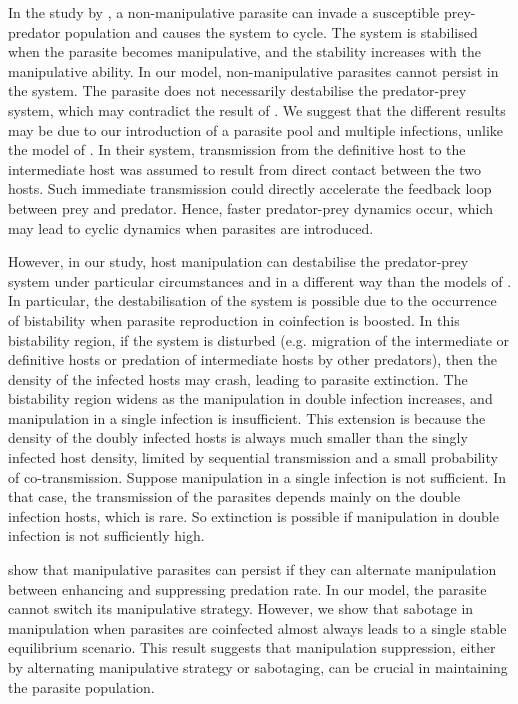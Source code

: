 \documentclass[11pt]{article}
\begin{document}
In the study by \cite{Rogawa2018}, a non-manipulative parasite can invade a susceptible prey-predator population and causes the system to cycle. 
The system is stabilised when the parasite becomes manipulative, and the stability increases with the manipulative ability.
In our model, non-manipulative parasites cannot persist in the system. The parasite does not necessarily destabilise the predator-prey system, which may contradict the result of \cite{Rogawa2018}. 
We suggest that the different results may be due to our introduction of a parasite pool and multiple infections, unlike the model of \cite{Rogawa2018}. 
In their system, transmission from the definitive host to the intermediate host was assumed to result from direct contact between the two hosts. 
Such immediate transmission could directly accelerate the feedback loop between prey and predator. 
Hence, faster predator-prey dynamics occur, which may lead to cyclic dynamics when parasites are introduced.

However, in our study, host manipulation can destabilise the predator-prey system under particular circumstances and in a different way than the models of \cite{Rogawa2018}. 
In particular, the destabilisation of the system is possible due to the occurrence of bistability when parasite reproduction in coinfection is boosted. 
In this bistability region, if the system is disturbed (e.g. migration of the intermediate or definitive hosts or predation of intermediate hosts by other predators), then the density of the infected hosts may crash, leading to parasite extinction. 
The bistability region widens as the manipulation in double infection increases, and manipulation in a single infection is insufficient. 
This extension is because the density of the doubly infected hosts is always much smaller than the singly infected host density, limited by sequential transmission and a small probability of co-transmission. 
Suppose manipulation in a single infection is not sufficient. 
In that case, the transmission of the parasites depends mainly on the double infection hosts, which is rare. 
So extinction is possible if manipulation in double infection is not sufficiently high.

\cite{Iritani2018} show that manipulative parasites can persist if they can alternate manipulation between enhancing and suppressing predation rate. 
In our model, the parasite cannot switch its manipulative strategy. However, we show that sabotage in manipulation when parasites are coinfected almost always leads to a single stable equilibrium scenario. 
This result suggests that manipulation suppression, either by alternating manipulative strategy or sabotaging, can be crucial in maintaining the parasite population.
\end{document}
